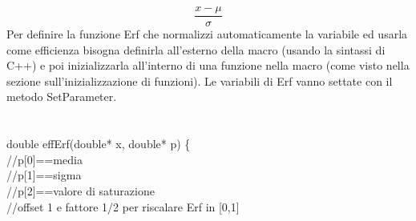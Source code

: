 \documentclass[10pt,a4paper]{article}
\begin{document}
\[\frac{x-\mu}{\sigma}\]
Per definire la funzione Erf che normalizzi automaticamente la variabile ed usarla come efficienza bisogna definirla all'esterno della macro (usando la sintassi di C++) e poi inizializzarla all'interno di una funzione nella macro (come visto nella sezione sull'inizializzazione di funzioni). Le variabili di Erf vanno settate con il metodo SetParameter.\\\\\\
double effErf(double* x, double* p) \{\\
	//p[0]==media\\
	//p[1]==sigma\\
	//p[2]==valore di saturazione\\
	//offset 1 e fattore 1/2 per riscalare Erf in [0,1]\\
	
\end{document}
